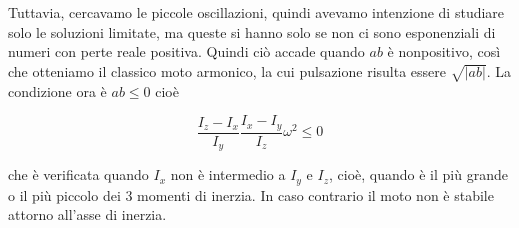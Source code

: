 \documentclass[../main.tex]{subfiles}
\begin{document}
 Tuttavia, cercavamo le piccole oscillazioni, quindi avevamo intenzione di studiare solo le soluzioni limitate, ma queste si hanno solo se 
 non ci sono esponenziali di numeri con perte reale positiva. Quindi ciò accade quando $ab$ è nonpositivo, così che otteniamo il classico moto armonico,
 la cui pulsazione risulta essere $\sqrt{|ab|}$. La condizione ora è $ab\leq 0$ cioè
 
 \begin{equation}
	\frac{I_z-I_x}{I_y}\frac{I_x-I_y}{I_z}\omega^2 \leq 0
 \end{equation}

 che è verificata quando $I_x$ non è intermedio a $I_y$ e $I_z$, cioè, quando è il più grande o il più piccolo dei 3 momenti di inerzia.
 In caso contrario il moto non è stabile attorno all'asse di inerzia.
 
\end{document}
